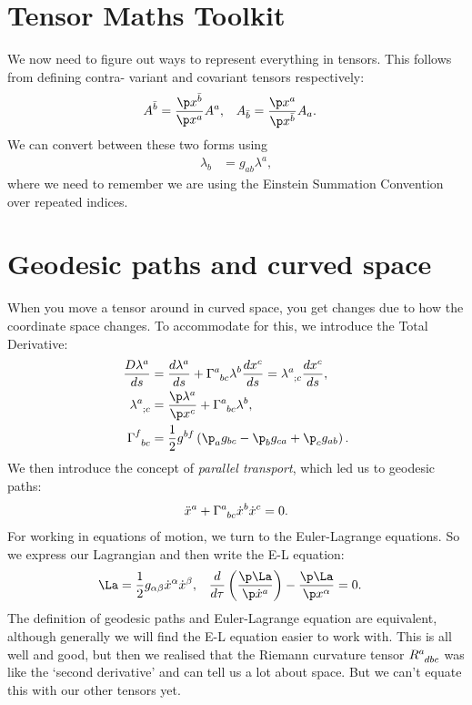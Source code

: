 \documentclass[a4paper, 11pt, normalem]{report}
\begin{document}
\section{Tensor Maths Toolkit}
We now need to figure out ways to represent everything in tensors.
This follows from defining contra- variant and covariant tensors respectively:
\begin{align}
    A^{\bar{b}} &= \frac{\p x^{\bar{b}}}{\p x^a}A^a, & A_{\bar{b}} &= \frac{\p x^a}{\p x^{\bar{b}}}A_a.
\end{align}
We can convert between these two forms using
\begin{align}
    \lambda_b &= g_{ab}\lambda^a,
\end{align}
where we need to remember we are using the Einstein Summation Convention over repeated indices.

\section{Geodesic paths and curved space}
When you move a tensor around in curved space, you get changes due to how the coordinate space changes.
To accommodate for this, we introduce the Total Derivative:
\begin{align}
    \frac{D\lambda^a}{ds} &= \frac{d\lambda^a}{ds} + \tensor{\Gamma}{^a_{bc}}\lambda^b\frac{dx^c}{ds} = \tensor{\lambda}{^a_{;c}}\frac{dx^c}{ds}, \\
    \tensor{\lambda}{^a_{;c}} &= \frac{\p\lambda^a}{\p x^c} + \tensor{\Gamma}{^a_{bc}}\lambda^b, \\
    \tensor{\Gamma}{^f_{bc}} &= \frac12 g^{bf}\left(\p_a g_{bc} - \p_b g_{ca} + \p_c g_{ab}\right).
\end{align}
We then introduce the concept of \emph{parallel transport}, which led us to geodesic paths:
\begin{align}
    \ddot{x}^a + \tensor{\Gamma}{^a_{bc}}\dot{x}^b\dot{x}^c = 0.
\end{align}
For working in equations of motion, we turn to the Euler-Lagrange equations.
So we express our Lagrangian and then write the E-L equation:
\begin{align}
    \La &= \frac12 g_{\alpha\beta}\dot{x}^\alpha\dot{x}^\beta, & \frac{d}{d\tau}\left(\frac{\p\La}{\p\dot{x}^a}\right) - \frac{\p\La}{\p x^\alpha} &= 0.
\end{align}
The definition of geodesic paths and Euler-Lagrange equation are equivalent, although generally we will find the E-L equation easier to work with.
This is all well and good, but then we realised that the Riemann curvature tensor $\tensor{R}{^a_{dbc}}$ was like the `second derivative' and can tell us a lot about space.
But we can't equate this with our other tensors yet.
\end{document}
